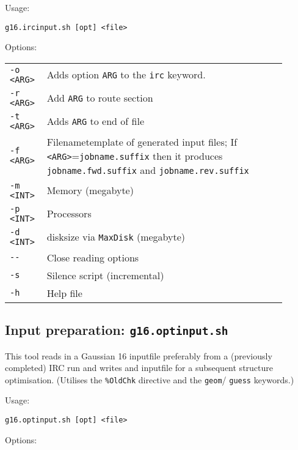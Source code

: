 \documentclass[   %
  final,          %
  a4paper         %
]{article}
\begin{document}
Usage: 

\lstinline`g16.ircinput.sh [opt] <file>`

Options:

\begin{tabular}{p{0.1\linewidth}p{0.8\linewidth}}
  {\lstinline`-o <ARG>`} & Adds option {\lstinline`ARG`} to the \texttt{irc} keyword. \\
  {\lstinline`-r <ARG>`} & Add {\lstinline`ARG`} to route section \\
  {\lstinline`-t <ARG>`} & Adds {\lstinline`ARG`} to end of file \\
  {\lstinline`-f <ARG>`} & Filenametemplate of generated input files; %
    If {\lstinline`<ARG>`=}\texttt{jobname.suffix} then it produces \texttt{jobname.fwd.suffix} and \texttt{jobname.rev.suffix}  \\
  {\lstinline`-m <INT>`} & Memory (megabyte) \\
  {\lstinline`-p <INT>`} & Processors \\
  {\lstinline`-d <INT>`} & disksize via \texttt{MaxDisk} (megabyte) \\
  {\lstinline`--`}       & Close reading options \\
  {\lstinline`-s`}       & Silence script (incremental) \\
  {\lstinline`-h`}       & Help file  \\
\end{tabular}

\subsection{Input preparation: \texorpdfstring{{\lstinline`g16.optinput.sh`}}{g16.optinput.sh}}

This tool reads in a Gaussian 16 inputfile preferably from a (previously completed) IRC run and 
writes and inputfile for a subsequent structure optimisation.
(Utilises the \texttt{\%OldChk} directive and the \texttt{geom}/ \texttt{guess} keywords.)

Usage: 

\lstinline`g16.optinput.sh [opt] <file>`

Options:
\end{document}
